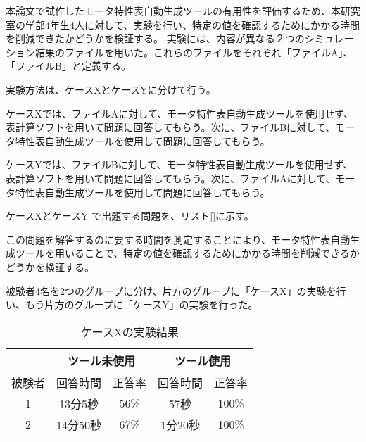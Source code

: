 本論文で試作したモータ特性表自動生成ツールの有用性を評価するため、本研究室の学部4年生4人に対して、実験を行い、特定の値を確認するためにかかる時間を削減できたかどうかを検証する。
実験には、内容が異なる２つのシミュレーション結果のファイルを用いた。これらのファイルをそれぞれ「ファイルA」、「ファイルB」と定義する。

実験方法は、ケースXとケースYに分けて行う。

ケースXでは、ファイルAに対して、モータ特性表自動生成ツールを使用せず、表計算ソフトを用いて問題に回答してもらう。次に、ファイルBに対して、モータ特性表自動生成ツールを使用して問題に回答してもらう。

ケースYでは、ファイルBに対して、モータ特性表自動生成ツールを使用せず、表計算ソフトを用いて問題に回答してもらう。次に、ファイルAに対して、モータ特性表自動生成ツールを使用して問題に回答してもらう。

ケースXとケースY で出題する問題を、リスト\ref{}に示す。

この問題を解答するのに要する時間を測定することにより、モータ特性表自動生成ツールを用いることで、特定の値を確認するためにかかる時間を削減できるかどうかを検証する。

被験者4名を2つのグループに分け、片方のグループに「ケースX」の実験を行い、もう片方のグループに「ケースY」の実験を行った。


\begin{table}[tp]
  \begin{center}
    \caption{ケースXの実験結果}
    \label{resultX}
    \begin{tabular}{c|c|c|c|c|}
    \cline{2-5}
                              & \multicolumn{2}{c|}{ツール未使用} & \multicolumn{2}{c|}{ツール使用} \\ \hline
    \multicolumn{1}{|c||}{被験者} & 回答時間           & 正答率          & 回答時間           & 正答率         \\ \hline\hline
    \multicolumn{1}{|c||}{1}   & 13分5秒           & 56\%         & 57秒           & 100\%         \\ \hline
    \multicolumn{1}{|c||}{2}   & 14分50秒          & 67\%          & 1分20秒          & 100\%         \\ \hline
    \end{tabular}
  \end{center}
\end{table}

